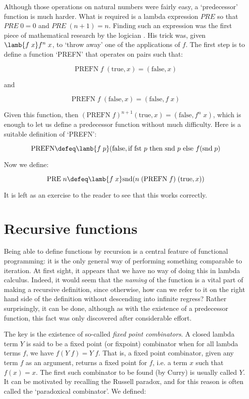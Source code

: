 Although those operations on natural numbers were fairly easy, a `predecessor'
function is much harder. What is required is a lambda expression $PRE$ so
that $PRE\; 0 = 0$ and $PRE\; (n + 1) = n$. Finding such an expression was the
first piece of mathematical research by the logician .
His trick was, given $\lamb{f\;x} f^n\; x$, to `throw away' one of the
applications of $f$. The first step is to define a function `PREFN' that
operates on pairs such that:

$$ \mbox{PREFN}\; f\; (\mbox{true},x) = (\mbox{false},x) $$

\noindent and

$$ \mbox{PREFN}\; f\; (\mbox{false},x) = (\mbox{false},f\; x) $$

Given this function, then $(\mbox{PREFN}\; f)^{n + 1} (\mbox{true},x) =
(\mbox{false},f^n\;x)$, which is enough to let us define a predecessor
function without much difficulty. Here is a suitable definition of `PREFN':

$$ \mbox{PREFN} \defeq
   \lamb{f\; p} (\mbox{false},
      \mbox{if fst } p \mbox{ then snd } p \mbox{ else } f(\mbox{snd}\; p) $$

\noindent Now we define:

$$ \mbox{PRE}\; n \defeq \lamb{f\; x}
       \mbox{snd} (n\; (\mbox{PREFN}\; f)\; (\mbox{true},x)) $$

\noindent It is left as an exercise to the reader to see that this works
correctly.

\section{Recursive functions}

Being able to define functions by recursion is a central feature of functional
programming: it is the only general way of performing something comparable to
iteration. At first sight, it appears that we have no way of doing this in
lambda calculus. Indeed, it would seem that the {\em naming} of the function is
a vital part of making a recursive definition, since otherwise, how can we
refer to it on the right hand side of the definition without descending into
infinite regress? Rather surprisingly, it can be done, although as with the
existence of a predecessor function, this fact was only discovered after
considerable effort.

The key is the existence of so-called {\em fixed point combinators}. A closed
lambda term $Y$ is said to be a fixed point (or fixpoint) combinator when for
all lambda terms $f$, we have $f(Y\; f) = Y\; f$. That is, a fixed point
combinator, given any term $f$ as an argument, returns a fixed point for $f$,
i.e. a term $x$ such that $f(x) = x$. The first such combinator to be found (by
Curry) is usually called $Y$. It can be motivated by recalling the Russell
paradox, and for this reason is often called the `paradoxical combinator'. We
defined:

